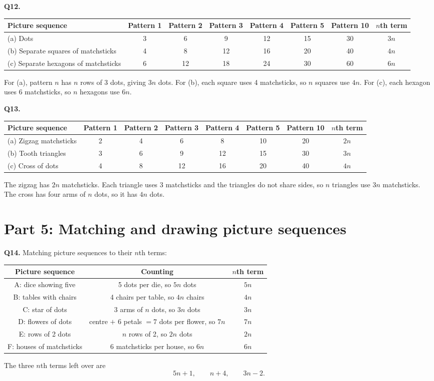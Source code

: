 \documentclass[11pt,a4paper]{article}
\begin{document}
\textbf{Q12.}
\begin{center}\small
\begin{tabular}{|l|*{6}{c|}c|}\hline
Picture sequence & Pattern 1 & Pattern 2 & Pattern 3 & Pattern 4 & Pattern 5 & Pattern 10 & \(n\)th term\\\hline
(a) Dots & 3 & 6 & 9 & 12 & 15 & 30 & \(3n\)\\
(b) Separate squares of matchsticks & 4 & 8 & 12 & 16 & 20 & 40 & \(4n\)\\
(c) Separate hexagons of matchsticks & 6 & 12 & 18 & 24 & 30 & 60 & \(6n\)\\\hline
\end{tabular}
\end{center}
For (a), pattern \(n\) has \(n\) rows of 3 dots, giving \(3n\) dots. For (b), each square uses 4 matchsticks, so \(n\) squares use \(4n\). For (c), each hexagon uses 6 matchsticks, so \(n\) hexagons use \(6n\).

\textbf{Q13.}
\begin{center}\small
\begin{tabular}{|l|*{6}{c|}c|}\hline
Picture sequence & Pattern 1 & Pattern 2 & Pattern 3 & Pattern 4 & Pattern 5 & Pattern 10 & \(n\)th term\\\hline
(a) Zigzag matchsticks & 2 & 4 & 6 & 8 & 10 & 20 & \(2n\)\\
(b) Tooth triangles & 3 & 6 & 9 & 12 & 15 & 30 & \(3n\)\\
(c) Cross of dots & 4 & 8 & 12 & 16 & 20 & 40 & \(4n\)\\\hline
\end{tabular}
\end{center}
The zigzag has \(2n\) matchsticks. Each triangle uses 3 matchsticks and the triangles do not share sides, so \(n\) triangles use \(3n\) matchsticks. The cross has four arms of \(n\) dots, so it has \(4n\) dots.

\section*{Part 5: Matching and drawing picture sequences}

\textbf{Q14.} Matching picture sequences to their \(n\)th terms:
\begin{center}\small
\begin{tabular}{|c|c|c|}\hline
Picture sequence & Counting & \(n\)th term\\\hline
A: dice showing five & 5 dots per die, so \(5n\) dots & \(5n\)\\
B: tables with chairs & 4 chairs per table, so \(4n\) chairs & \(4n\)\\
C: star of dots & 3 arms of \(n\) dots, so \(3n\) dots & \(3n\)\\
D: flowers of dots & centre \(+\) 6 petals \(=7\) dots per flower, so \(7n\) & \(7n\)\\
E: rows of 2 dots & \(n\) rows of 2, so \(2n\) dots & \(2n\)\\
F: houses of matchsticks & 6 matchsticks per house, so \(6n\) & \(6n\)\\\hline
\end{tabular}
\end{center}
The three \(n\)th terms left over are
\[
5n+1,\qquad n+4,\qquad 3n-2.
\]
\end{document}
